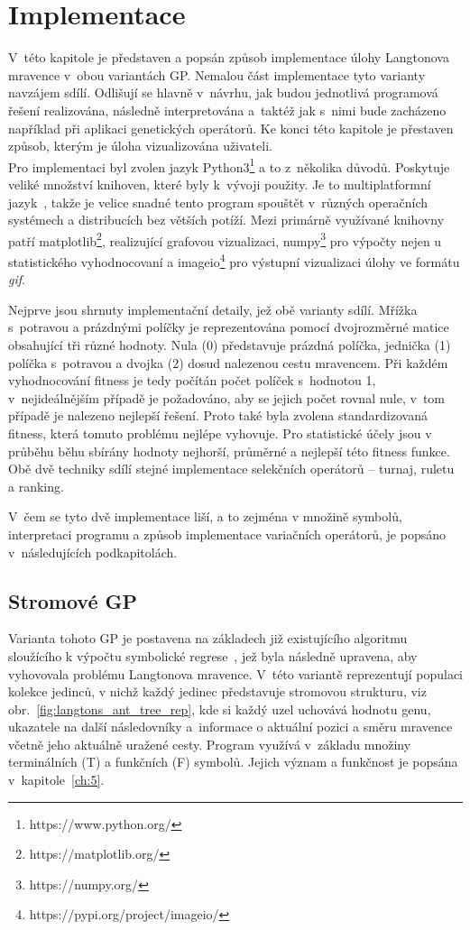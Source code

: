 \chapter{Implementace}\label{ch:6}
V~této kapitole je představen a popsán způsob implementace úlohy Langtonova mravence v~obou variantách GP. Nemalou část implementace tyto varianty navzájem sdílí. Odlišují se hlavně v~návrhu, jak budou jednotlivá programová řešení realizována, následně interpretována a~taktéž jak s~nimi bude zacházeno například při aplikaci genetických operátorů. Ke konci této kapitole je přestaven způsob, kterým je úloha vizualizována uživateli.\\

Pro implementaci byl zvolen jazyk Python3\footnote{https://www.python.org/} a to z~několika důvodů. Poskytuje veliké množství knihoven, které byly k~vývoji použity. Je to multiplatformní jazyk~\cite{payne_2022}, takže je velice snadné tento program spouštět v~různých operačních systémech a distribucích bez větších potíží. Mezi primárně využívané knihovny patří matplotlib\footnote{https://matplotlib.org/}, realizující grafovou vizualizaci, numpy\footnote{https://numpy.org/} pro výpočty nejen u statistického vyhodnocovaní a imageio\footnote{https://pypi.org/project/imageio/} pro výstupní vizualizaci úlohy ve formátu \emph{gif}.

Nejprve jsou shrnuty implementační detaily, jež obě varianty sdílí. Mřížka s~potravou a prázdnými políčky je reprezentována pomocí dvojrozměrné matice obsahující tři různé hodnoty. Nula (0) představuje prázdná políčka, jednička (1) políčka s~potravou a dvojka (2) dosud nalezenou cestu mravencem. Při každém vyhodnocování fitness je tedy počítán počet políček s~hodnotou 1, v~nejideálnějším případě je požadováno, aby se jejich počet rovnal nule, v~tom případě je nalezeno nejlepší řešení. Proto také byla zvolena standardizovaná fitness, která tomuto problému nejlépe vyhovuje. Pro statistické účely jsou v průběhu běhu sbírány hodnoty nejhorší, průměrné a nejlepší této fitness funkce. Obě dvě techniky sdílí stejné implementace selekčních operátorů -- turnaj, ruletu a ranking. 

V~čem se tyto dvě implementace liší, a to zejména v množině symbolů, interpretaci programu a způsob implementace variačních operátorů, je popsáno v~následujících podkapitolách. 

\section{Stromové GP}
Varianta tohoto GP je postavena na základech již existujícího algoritmu sloužícího k výpočtu symbolické regrese~\cite{Sipper2019tinyGP}, jež byla následně upravena, aby vyhovovala problému Langtonova mravence. V~této variantě reprezentují populaci kolekce jedinců, v nichž každý jedinec představuje stromovou strukturu, viz obr.~\ref{fig:langtons_ant_tree_rep}, kde si každý uzel uchovává hodnotu genu, ukazatele na další následovníky a~informace o aktuální pozici a směru mravence včetně jeho aktuálně uražené cesty. Program využívá v~základu množiny terminálních (T) a funkčních (F) symbolů. Jejich význam a funkčnost je popsána v~kapitole~\ref{ch:5}.  


